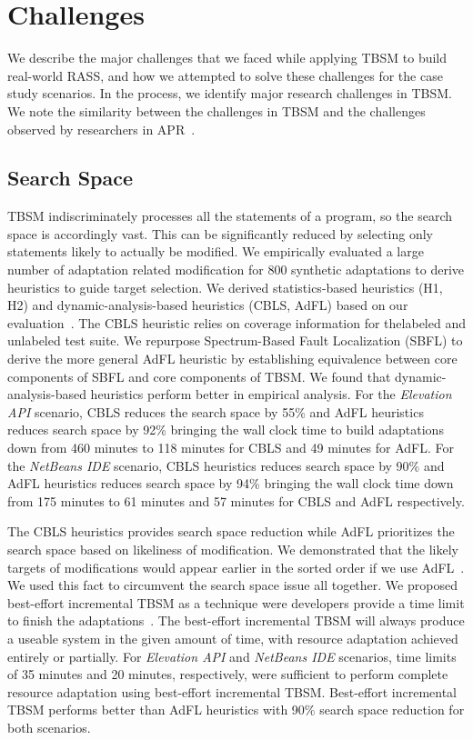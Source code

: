 \section{Challenges}
We describe the major challenges that we faced while applying TBSM to build real-world RASS, and how we attempted to solve these challenges for the case study scenarios. In the process, we identify major research challenges in TBSM. We note the similarity between the challenges in TBSM and the challenges observed by researchers in APR~\cite{LeGoues2013}.

\subsection{Search Space}
TBSM indiscriminately processes all the statements of a program, so the search space is accordingly vast. This can be significantly reduced by selecting only statements likely to actually be modified. We empirically evaluated a large number of adaptation related modification for 800 synthetic adaptations to derive heuristics to guide target selection. We derived statistics-based heuristics (H1, H2) and dynamic-analysis-based heuristics (CBLS, AdFL) based on our evaluation~\cite{christi2018qrs,christi2019qrs}. The CBLS heuristic relies on coverage information for thelabeled and unlabeled test suite. We repurpose Spectrum-Based Fault Localization (SBFL) to derive the more general AdFL heuristic by establishing equivalence between core components of SBFL and core components of TBSM. We found that dynamic-analysis-based heuristics  perform better in empirical analysis. For the \textit{Elevation API} scenario, CBLS reduces the search space by 55\% and AdFL heuristics reduces search space by 92\% bringing the wall clock time to build adaptations down from 460 minutes to 118 minutes for CBLS and 49 minutes for AdFL.  For the \textit{NetBeans IDE} scenario, CBLS heuristics reduces search space by 90\% and AdFL heuristics reduces search space by 94\% bringing the wall clock time down from 175 minutes to 61 minutes and 57 minutes for CBLS and AdFL respectively. 

The CBLS heuristics provides search space reduction while AdFL prioritizes the search space based on likeliness of modification. We demonstrated that the likely targets of modifications would appear earlier in the sorted order if we use AdFL~\cite{christi2019qrs}. We used this fact to circumvent the search space issue all together. We proposed best-effort incremental TBSM as a technique were developers provide a time limit to finish the adaptations~\cite{christi2019qrs}. The best-effort incremental TBSM will always produce a useable system in the given amount of time, with resource adaptation achieved entirely or partially. For \textit{Elevation API} and \textit{NetBeans IDE} scenarios, time limits of 35 minutes and 20 minutes, respectively, were sufficient to perform complete resource adaptation using best-effort incremental TBSM. Best-effort incremental TBSM performs better than AdFL heuristics with 90\% search space reduction for both scenarios. 

